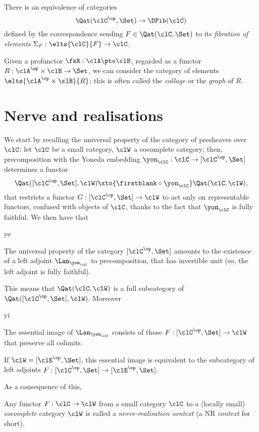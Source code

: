 \documentclass[a4paper]{../birkjour}
\begin{document}
\begin{theorem}\label{thm:equconfib}
	There is an equivalence of categories
	\[
		\Qat(\clC^\op,\Set) \to \DFib(\clC)
	\]
	defined by the correspondence sending $F\in\Qat(\clC,\Set)$ to its \emph{fibration of elements}  $\Sigma_F : \elts{\clC}{F} \to \clC$.
\end{theorem}
\begin{corollary}
  Given a profunctor $\fkR : \clA \pto \clB$, regarded as a functor $R : \clA^\op\times \clB \to \Set$, we can consider the category of elements $\elts{\clA^\op\times\clB}{R}$; this is often called the \emph{collage} or the \emph{graph} of $R$.
\end{corollary}
\section{Nerve and realisations}
\label{sec:org1a423df}
We start by recalling the universal property of the category of presheaves over $\clC$:
let $\clC$ be a small category, $\clW$ a cocomplete category; then, precomposition with the Yoneda embedding $\yon_{\clC} : \clC \to [\clC^\op, \Set]$ determines a functor
\[\Qat([\clC^\op, \Set], \clW)\xto{\firstblank\circ \yon_{\clC}} \Qat(\clC,\clW),\]
that restricts a functor $G : [\clC^\op, \Set]\to \clW$ to act only on representable functors, confused with objects of $\clC$, thanks to the fact that $\yon_\clC$ is fully faithful. We then have that
\begin{theorem}\label{yext_are_good}\leavevmode
	\begin{enumtag}{ye}
		\item The universal property of the category $[\clC^\op, \Set]$ amounts to the existence of a left adjoint $\Lan_{\yon_{\clC}}$ to precomposition, that has invertible unit (so, the left adjoint is fully faithful).
	\end{enumtag}
	This means that $\Qat(\clC,\clW)$ is a full subcategory of $\Qat([\clC^\op, \Set], \clW)$. Moreover
	\begin{enumtag}{yi}
		\item The essential image of $\Lan_{\yon_{\clC}}$ consists of those $F : [\clC^\op, \Set] \to \clW$ that preserve all colimits.
		\item If $\clW = [\clE^\op, \Set]$, this essential image is equivalent to the subcategory of left adjoints $F : [\clC^\op, \Set] \to [\clE^\op, \Set]$.
	\end{enumtag}
\end{theorem}
As a consequence of this,
\begin{definition}\label{nr-para}
	Any functor $F : \clC\to \clW$ from a small category $\clC$ to a (locally small) \emph{cocomplete} category $\clW$ is called a \emph{nerve\hyp{}realisation context} (a NR \emph{context} for short).
\end{definition}
\end{document}
